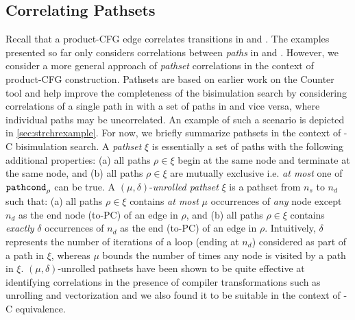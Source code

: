 \subsection{Correlating Pathsets}
\label{sec:pathsetcorrel}
Recall that a product-CFG edge correlates transitions in \sprog{} and \cprog{}.
The examples presented so far only considers correlations between {\em paths} in \sprog{} and \cprog{}.
However, we consider a more general approach of {\em pathset} correlations in the context of product-CFG construction.
Pathsets are based on earlier work on the Counter tool \cite{oopsla20,shubhanipdhthesis}
and help improve the completeness of the bisimulation search by considering correlations of a single path in \cprog{}
with a set of paths in \sprog{} and vice versa, where individual paths may be uncorrelated.
An example of such a scenario is depicted in \cref{sec:strchrexample}.
For now, we briefly summarize pathsets in the context of \SpecL{}-C bisimulation search.
A {\em pathset} $\xi$ is essentially a set of paths with the following additional properties:
(a) all paths $\rho \in \xi$ begin at the same node and terminate at the same node, and
(b) all paths $\rho \in \xi$ are mutually exclusive i.e. {\em at most} one of ${\tt pathcond}_{\rho}$ can be true.
A $(\mu,\delta)$-{\em unrolled pathset} $\xi$ is a pathset from $n_s$ to $n_d$ such that:
(a) all paths $\rho \in \xi$ contains {\em at most} $\mu$ occurrences of {\em any} node except $n_d$ as the end node (to-PC) of an edge in $\rho$, and
(b) all paths $\rho \in \xi$ contains {\em exactly} $\delta$ occurrences of $n_d$ as the end (to-PC) of an edge in $\rho$.
Intuitively, $\delta$ represents the number of iterations of a loop (ending at $n_d$) considered as part of a path in $\xi$,
whereas $\mu$ bounds the number of times any node is visited by a path in $\xi$.
$(\mu,\delta)$-unrolled pathsets have been shown to be quite effective at identifying correlations in the presence of
compiler transformations such as unrolling and vectorization \cite{shubhanipdhthesis} and we also found it to be
suitable in the context of \SpecL{}-C equivalence.

